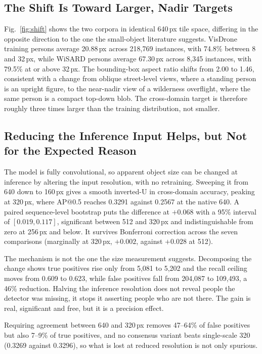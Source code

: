 \documentclass[conference]{IEEEtran}
\begin{document}
\subsection{The Shift Is Toward Larger, Nadir Targets}

Fig.~\ref{fig:shift} shows the two corpora in identical 640\,px tile space,
differing in the opposite direction to the one the small-object literature
suggests. VisDrone training persons average 20.88\,px across 218,769 instances,
with 74.8\% between 8 and 32\,px, while WiSARD persons average 67.30\,px across
8,345 instances, with 79.5\% at or above 32\,px. The bounding-box aspect ratio
shifts from 2.00 to 1.46, consistent with a change from oblique street-level
views, where a standing person is an upright figure, to the near-nadir view of a
wilderness overflight, where the same person is a compact top-down blob. The
cross-domain target is therefore roughly three times larger than the training
distribution, not smaller.

\subsection{Reducing the Inference Input Helps, but Not for the Expected Reason}

The model is fully convolutional, so apparent object size can be changed at
inference by altering the input resolution, with no retraining. Sweeping it from
640 down to 160\,px gives a smooth inverted-U in cross-domain accuracy, peaking
at 320\,px, where AP@0.5 reaches 0.3291 against 0.2567 at the native 640. A
paired sequence-level bootstrap puts the difference at $+0.068$ with a 95\%
interval of $[0.019, 0.117]$, significant between 512 and 320\,px and
indistinguishable from zero at 256\,px and below. It survives Bonferroni
correction across the seven comparisons (marginally at 320\,px, $+0.002$,
against $+0.028$ at 512).

The mechanism is not the one the size measurement suggests. Decomposing the
change shows true positives rise only from 5,081 to 5,202 and the recall ceiling
moves from 0.609 to 0.623, while false positives fall from 204,087 to 109,493, a
46\% reduction. Halving the inference resolution does not reveal people the
detector was missing, it stops it asserting people who are not there. The gain
is real, significant and free, but it is a precision effect.

Requiring agreement between 640 and 320\,px removes 47--64\% of false positives
but also 7--9\% of true positives, and no consensus variant beats single-scale
320 (0.3269 against 0.3296), so what is lost at reduced resolution is not only
spurious.
\end{document}
